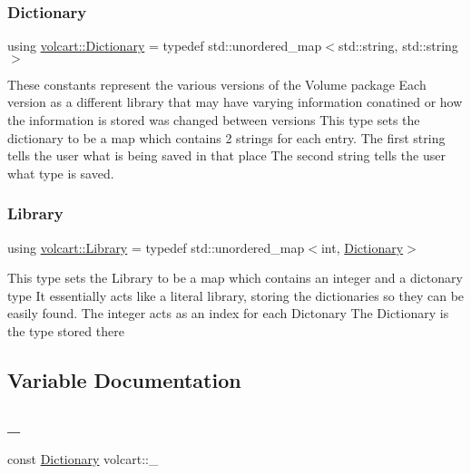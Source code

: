 \subsubsection{\texorpdfstring{Dictionary}{Dictionary}}
{\footnotesize\ttfamily using \hyperlink{namespacevolcart_aa4e334ff80b678b9556aee59618eb37a}{volcart\+::\+Dictionary} = typedef std\+::unordered\+\_\+map$<$std\+::string, std\+::string$>$}

These constants represent the various versions of the Volume package Each version as a different library that may have varying information conatined or how the information is stored was changed between versions This type sets the dictionary to be a map which contains 2 strings for each entry. The first string tells the user what is being saved in that place The second string tells the user what type is saved. \hypertarget{namespacevolcart_a90354e3717094cf66f2c1310f12b2e4e}{}\label{namespacevolcart_a90354e3717094cf66f2c1310f12b2e4e} 
\subsubsection{\texorpdfstring{Library}{Library}}
{\footnotesize\ttfamily using \hyperlink{namespacevolcart_a90354e3717094cf66f2c1310f12b2e4e}{volcart\+::\+Library} = typedef std\+::unordered\+\_\+map$<$int, \hyperlink{namespacevolcart_aa4e334ff80b678b9556aee59618eb37a}{Dictionary}$>$}

This type sets the Library to be a map which contains an integer and a dictonary type It essentially acts like a literal library, storing the dictionaries so they can be easily found. The integer acts as an index for each Dictonary The Dictionary is the type stored there 

\subsection{Variable Documentation}
\hypertarget{namespacevolcart_aff81b62f1e73f2f96669772bab7e2425}{}\label{namespacevolcart_aff81b62f1e73f2f96669772bab7e2425} 
\subsubsection{\texorpdfstring{\+\_}{\_1}}
{\footnotesize\ttfamily const \hyperlink{namespacevolcart_aa4e334ff80b678b9556aee59618eb37a}{Dictionary} volcart\+::\+\_}

